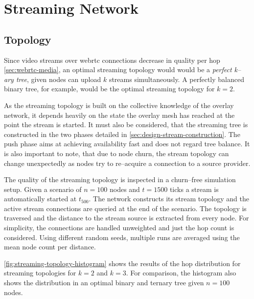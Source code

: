 \section{Streaming Network}

\subsection{Topology}

Since video streams over \gls{webrtc} connections decrease in quality per hop \cref{sec:webrtc-media}, an optimal streaming topology would would be a \textit{perfect k–ary tree}, given nodes can upload $k$ streams simultaneously. A perfectly balanced binary tree, for example, would be the optimal streaming topology for $k=2$.

As the streaming topology is built on the collective knowledge of the overlay network, it depends heavily on the state the overlay mesh has reached at the point the stream is started. It must also be considered, that the streaming tree is constructed in the two phases detailed in \vref{sec:design-stream-construction}. The push phase aims at achieving availability fast and does not regard tree balance.
It is also important to note, that due to node churn, the stream topology can change unexpectedly as nodes try to re–acquire a connection to a source provider.

The quality of the streaming topology is inspected in a churn–free simulation setup. Given a scenario of $n=100$ nodes and $t=1500$ ticks a stream is automatically started at $t_{500}$. The network constructs its stream topology and the active stream connections are queried at the end of the scenario. The topology is traversed and the distance to the stream source is extracted from every node. For simplicity, the connections are handled unweighted and just the hop count is considered.
Using different random seeds, multiple runs are averaged using the mean node count per distance.

\vref{fig:streaming-topology-histogram} shows the results of the hop distribution for streaming topologies for $k=2$ and $k=3$. For comparison, the histogram also shows the distribution in an optimal binary and ternary tree given $n=100$ nodes.

